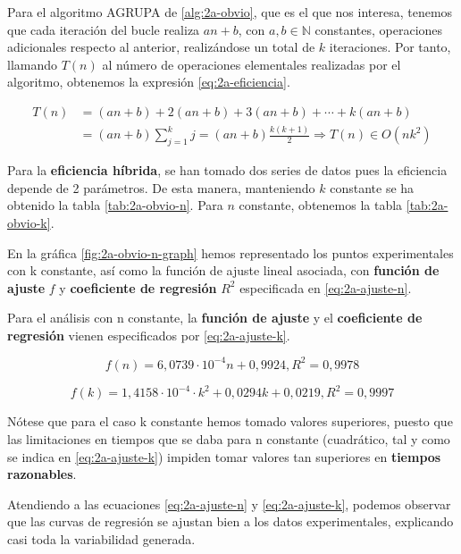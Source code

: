 Para el algoritmo AGRUPA de \ref{alg:2a-obvio}, que es el que nos interesa,
tenemos que cada iteración del bucle realiza $an + b$, con $a,b \in \mathbb N$ constantes,
operaciones adicionales respecto al anterior,
realizándose un total de $k$ iteraciones. Por tanto, llamando $T(n)$ al número de
operaciones elementales realizadas por el algoritmo, obtenemos la 
expresión \ref{eq:2a-eficiencia}. 

\begin{equation} \label{eq:2a-eficiencia}
    \begin{split}
        T(n) & = (an + b) + 2(an + b) + 3(an + b) + \cdots + k(an + b) \\
             & = (an + b)\sum_{j=1}^k j = (an + b) \frac{k(k+1)}{2} \Rightarrow \boxed{T(n) \in O(nk^2)}
    \end{split}
\end{equation}

Para la \textbf{eficiencia híbrida}, se han tomado dos series de datos pues la eficiencia depende de 2 parámetros.
De esta manera, manteniendo $k$ constante se ha obtenido la tabla \ref{tab:2a-obvio-n}. 
Para $n$ constante, obtenemos la tabla
 \ref{tab:2a-obvio-k}. 

En la gráfica \ref{fig:2a-obvio-n-graph} hemos representado los puntos experimentales con k constante, 
así como la función
de ajuste lineal asociada, con \textbf{función de ajuste} $f$ y \textbf{coeficiente de regresión}
$R^2$ especificada en \ref{eq:2a-ajuste-n}. 

Para el análisis con n constante, la \textbf{función de ajuste} y el 
\textbf{coeficiente de regresión} vienen especificados por \ref{eq:2a-ajuste-k}.

\begin{equation}
    \boxed{f(n) = 6,0739 \cdot 10 ^{-4}  n + 0,9924, R^2 = 0,9978}
    \label{eq:2a-ajuste-n}
\end{equation}

\begin{equation}
\boxed{f(k) = 1,4158 \cdot 10^{-4} \cdot k^2 + 0,0294 k + 0,0219, R^2 = 0,9997}
\label{eq:2a-ajuste-k}
\end{equation}

Nótese que para el caso k constante hemos tomado valores superiores, puesto
que las limitaciones en tiempos que se daba para n constante (cuadrático, 
tal y como se indica en \ref{eq:2a-ajuste-k}) impiden tomar valores
tan superiores en \textbf{tiempos razonables}. 

Atendiendo a las ecuaciones \ref{eq:2a-ajuste-n} y \ref{eq:2a-ajuste-k}, 
podemos observar que las curvas de regresión se ajustan bien a los
datos experimentales, explicando casi toda la variabilidad generada. 


